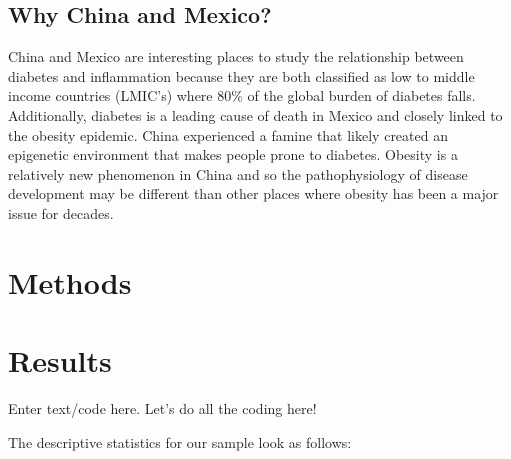 \documentclass[
  man,floatsintext]{apa6}
\begin{document}
\hypertarget{why-china-and-mexico}{%
\subsection{Why China and Mexico?}\label{why-china-and-mexico}}

China and Mexico are interesting places to study the relationship between diabetes and inflammation because they are both classified as low to middle income countries (LMIC's) where 80\% of the global burden of diabetes falls. Additionally, diabetes is a leading cause of death in Mexico and closely linked to the obesity epidemic. China experienced a famine that likely created an epigenetic environment that makes people prone to diabetes. Obesity is a relatively new phenomenon in China and so the pathophysiology of disease development may be different than other places where obesity has been a major issue for decades.

\hypertarget{methods}{%
\section{Methods}\label{methods}}

\hypertarget{results}{%
\section{Results}\label{results}}

Enter text/code here. Let's do all the coding here!

The descriptive statistics for our sample look as follows:
\end{document}
